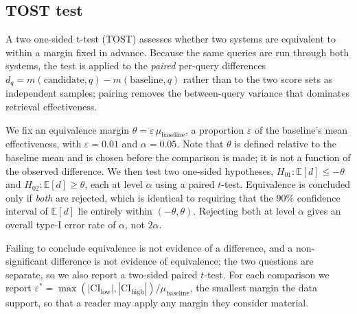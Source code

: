 \subsection*{TOST test}

A two one-sided t-test (TOST) assesses whether two systems are equivalent to within a margin fixed in advance. Because the same queries are run through both systems, the test is applied to the \emph{paired} per-query differences $d_q = m(\text{candidate}, q) - m(\text{baseline}, q)$ rather than to the two score sets as independent samples; pairing removes the between-query variance that dominates retrieval effectiveness.

We fix an equivalence margin $\theta = \varepsilon\,\mu_{\text{baseline}}$, a proportion $\varepsilon$ of the baseline's mean effectiveness, with $\varepsilon = 0.01$ and $\alpha = 0.05$. Note that $\theta$ is defined relative to the baseline mean and is chosen before the comparison is made; it is not a function of the observed difference. We then test two one-sided hypotheses, $H_{01}: \mathbb{E}[d] \leq -\theta$ and $H_{02}: \mathbb{E}[d] \geq \theta$, each at level $\alpha$ using a paired $t$-test. Equivalence is concluded only if \emph{both} are rejected, which is identical to requiring that the $90\%$ confidence interval of $\mathbb{E}[d]$ lie entirely within $(-\theta, \theta)$. Rejecting both at level $\alpha$ gives an overall type-I error rate of $\alpha$, not $2\alpha$.

Failing to conclude equivalence is not evidence of a difference, and a non-significant difference is not evidence of equivalence; the two questions are separate, so we also report a two-sided paired $t$-test. For each comparison we report $\varepsilon^{*} = \max(|\text{CI}_{\text{low}}|, |\text{CI}_{\text{high}}|) / \mu_{\text{baseline}}$, the smallest margin the data support, so that a reader may apply any margin they consider material.
